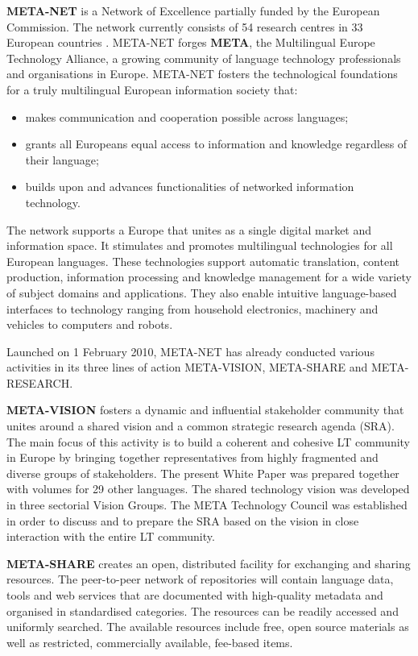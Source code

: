   \begin{multicols}{2}
\textbf{META-NET} is a Network of Excellence partially funded by the European Commission. The network currently consists of 54 research centres in 33 European countries \cite{rehm2011}. META-NET forges \textbf{META}, the Multilingual Europe Technology Alliance, a growing community of language technology professionals and organisations in Europe. META-NET fosters the technological foundations for a truly multilingual European information society that:

  \begin{itemize}
  \item makes communication and cooperation possible across languages;
\item grants all Europeans equal access to information and knowledge regardless of their language; 
\item builds upon and advances functionalities of networked information technology.
  \end{itemize}

The network supports a Europe that unites as a single digital market and information space. It stimulates and promotes multilingual technologies for all European languages. These technologies support automatic translation, content production, information processing and knowledge management for a wide variety of subject domains and applications. They also enable intuitive language-based interfaces to technology ranging from household electronics, machinery and vehicles to computers and robots.

Launched on 1 February 2010, META-NET has already conducted various activities in its three lines of action META-VISION, META-SHARE and META-RESEARCH. 

\textbf{META-VISION} fosters a dynamic and inﬂuential stakeholder community that unites around a shared vision and a common strategic research agenda (SRA). The main focus of this activity is to build a coherent and cohesive LT community in Europe by bringing together representatives from highly fragmented and diverse groups of stakeholders. The present White Paper was prepared together with volumes for 29 other languages. The shared technology vision was developed in three sectorial Vision Groups. The META Technology Council was established in order to discuss and to prepare the SRA based on the vision in close interaction with the entire LT community.

\textbf{META-SHARE} creates an open, distributed facility for exchanging and sharing resources. The peer-to-peer network of repositories will contain language data, tools and web services that are documented with high-quality metadata and organised in standardised categories. The resources can be readily accessed and uniformly searched. The available resources include free, open source materials as well as restricted, commercially available, fee-based items. 


\end{multicols}
